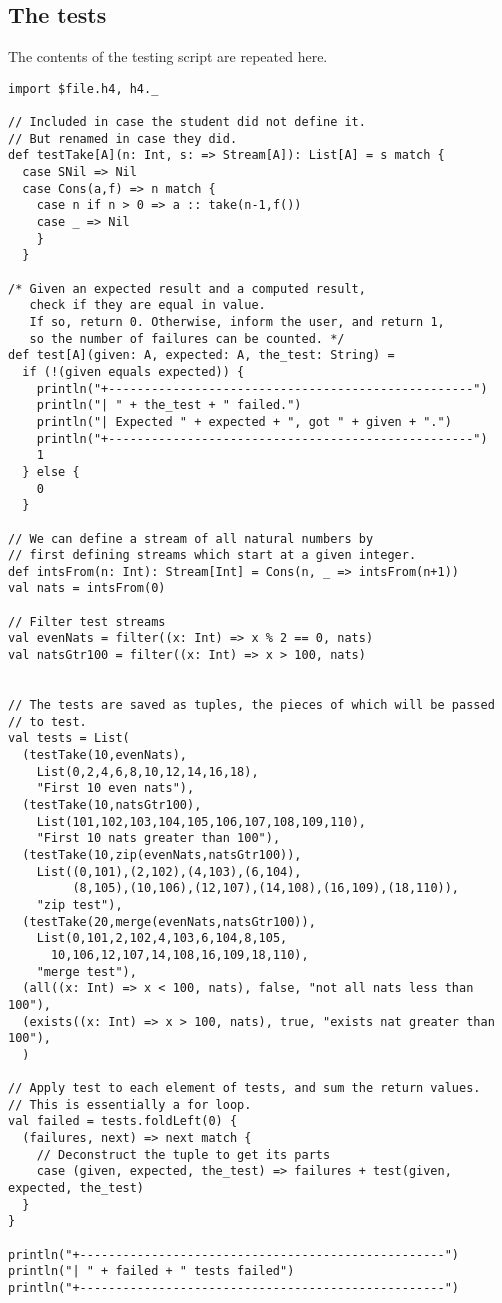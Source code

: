 \documentclass[11pt]{article}
\begin{document}
\subsection*{The tests}
\label{sec:org603c11b}
The contents of the testing script are repeated here.

\begin{verbatim}
import $file.h4, h4._

// Included in case the student did not define it.
// But renamed in case they did.
def testTake[A](n: Int, s: => Stream[A]): List[A] = s match {
  case SNil => Nil
  case Cons(a,f) => n match {
    case n if n > 0 => a :: take(n-1,f())
    case _ => Nil
    }
  }

/* Given an expected result and a computed result,
   check if they are equal in value.
   If so, return 0. Otherwise, inform the user, and return 1,
   so the number of failures can be counted. */
def test[A](given: A, expected: A, the_test: String) =
  if (!(given equals expected)) {
    println("+---------------------------------------------------")
    println("| " + the_test + " failed.")
    println("| Expected " + expected + ", got " + given + ".")
    println("+---------------------------------------------------")
    1
  } else {
    0
  }

// We can define a stream of all natural numbers by
// first defining streams which start at a given integer.
def intsFrom(n: Int): Stream[Int] = Cons(n, _ => intsFrom(n+1))
val nats = intsFrom(0)

// Filter test streams
val evenNats = filter((x: Int) => x % 2 == 0, nats)
val natsGtr100 = filter((x: Int) => x > 100, nats)


// The tests are saved as tuples, the pieces of which will be passed
// to test.
val tests = List(
  (testTake(10,evenNats),
    List(0,2,4,6,8,10,12,14,16,18),
    "First 10 even nats"),
  (testTake(10,natsGtr100),
    List(101,102,103,104,105,106,107,108,109,110),
    "First 10 nats greater than 100"),
  (testTake(10,zip(evenNats,natsGtr100)),
    List((0,101),(2,102),(4,103),(6,104),
         (8,105),(10,106),(12,107),(14,108),(16,109),(18,110)),
    "zip test"),
  (testTake(20,merge(evenNats,natsGtr100)),
    List(0,101,2,102,4,103,6,104,8,105,
      10,106,12,107,14,108,16,109,18,110),
    "merge test"),
  (all((x: Int) => x < 100, nats), false, "not all nats less than 100"),
  (exists((x: Int) => x > 100, nats), true, "exists nat greater than 100"),
  )

// Apply test to each element of tests, and sum the return values.
// This is essentially a for loop.
val failed = tests.foldLeft(0) {
  (failures, next) => next match {
    // Deconstruct the tuple to get its parts
    case (given, expected, the_test) => failures + test(given, expected, the_test)
  }
}

println("+---------------------------------------------------")
println("| " + failed + " tests failed")
println("+---------------------------------------------------")
\end{verbatim}
\end{document}
